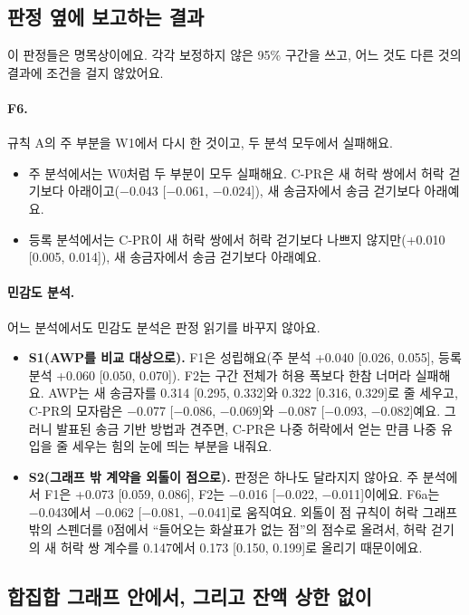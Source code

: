 \subsection{판정 옆에 보고하는 결과}

이 판정들은 명목상이에요. 각각 보정하지 않은 95\% 구간을 쓰고, 어느 것도 다른 것의 결과에 조건을 걸지 않았어요.

\paragraph{F6.}
규칙 A의 주 부분을 W1에서 다시 한 것이고, 두 분석 모두에서 실패해요.
\begin{itemize}
\item 주 분석에서는 W0처럼 두 부분이 모두 실패해요. C-PR은 새 허락 쌍에서 허락 걷기보다 아래이고(−0.043 [−0.061, −0.024]), 새 송금자에서 송금 걷기보다 아래예요.
\item 등록 분석에서는 C-PR이 새 허락 쌍에서 허락 걷기보다 나쁘지 않지만(+0.010 [0.005, 0.014]), 새 송금자에서 송금 걷기보다 아래예요.
\end{itemize}

\paragraph{민감도 분석.}
어느 분석에서도 민감도 분석은 판정 읽기를 바꾸지 않아요.
\begin{itemize}
\item \textbf{S1(AWP를 비교 대상으로).} F1은 성립해요(주 분석 +0.040 [0.026, 0.055], 등록 분석 +0.060 [0.050, 0.070]). F2는 구간 전체가 허용 폭보다 한참 너머라 실패해요. AWP는 새 송금자를 0.314 [0.295, 0.332]와 0.322 [0.316, 0.329]로 줄 세우고, C-PR의 모자람은 −0.077 [−0.086, −0.069]와 −0.087 [−0.093, −0.082]예요. 그러니 발표된 송금 기반 방법과 견주면, C-PR은 나중 허락에서 얻는 만큼 나중 유입을 줄 세우는 힘의 눈에 띄는 부분을 내줘요.
\item \textbf{S2(그래프 밖 계약을 외톨이 점으로).} 판정은 하나도 달라지지 않아요. 주 분석에서 F1은 +0.073 [0.059, 0.086], F2는 −0.016 [−0.022, −0.011]이에요. F6a는 −0.043에서 −0.062 [−0.081, −0.041]로 움직여요. 외톨이 점 규칙이 허락 그래프 밖의 스펜더를 0점에서 “들어오는 화살표가 없는 점”의 점수로 올려서, 허락 걷기의 새 허락 쌍 계수를 0.147에서 0.173 [0.150, 0.199]로 올리기 때문이에요.
\end{itemize}

\subsection{합집합 그래프 안에서, 그리고 잔액 상한 없이}
\label{sec:union}

